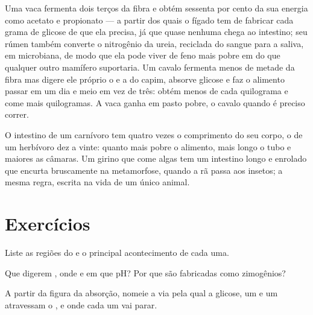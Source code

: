 \begin{example}\label{ex:b1:digestion-absorption:cowhorse}
Uma vaca fermenta dois terços da fibra e obtém sessenta por cento da
sua energia como acetato e propionato --- a partir dos quais o fígado
tem de fabricar cada grama de glicose de que ela precisa, já que quase
nenhuma chega ao intestino; seu rúmen também converte o nitrogênio da
ureia, reciclada do sangue para a saliva, em  microbiana, de
modo que ela pode viver de feno mais pobre em  do que qualquer
outro mamífero suportaria. Um cavalo fermenta menos de metade da fibra
mas digere ele próprio o  e a  do capim, absorve glicose
e faz o alimento passar em um dia e meio em vez de três: obtém menos
de cada quilograma e come mais quilogramas. A vaca ganha em pasto
pobre, o cavalo quando é preciso correr.
\end{example}

\begin{remark}\label{rem:b1:digestion-absorption:length}
O intestino de um carnívoro tem quatro vezes o comprimento do seu
corpo, o de um herbívoro dez a vinte: quanto mais pobre o alimento,
mais longo o tubo e maiores as câmaras. Um girino que come algas tem
um intestino longo e enrolado que encurta bruscamente na metamorfose,
quando a rã passa aos insetos; a mesma regra, escrita na vida de um
único animal.
\end{remark}

\section{Exercícios}

\begin{exercise}[$\star$]\label{exo:b1:digestion-absorption:1}
Liste as regiões do  e o principal acontecimento de cada uma.
\end{exercise}

\begin{exercise}[$\star$]\label{exo:b1:digestion-absorption:2}
Que  digerem , onde e em que pH? Por que são fabricadas
como zimogênios?
\end{exercise}

\begin{exercise}[$\star$]\label{exo:b1:digestion-absorption:3}
A partir da figura da absorção, nomeie a via pela qual a glicose, um
 e um  atravessam o , e onde cada um
vai parar.
\end{exercise}

